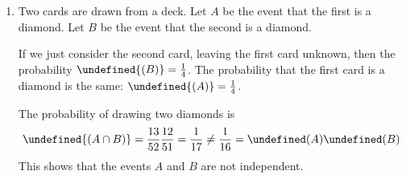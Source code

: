 \documentclass[letterpaper,11pt]{article}
\let\P\undefined
\DeclareMathOperator{\P}{\mathbb{P}}
\newcommand{\intersn}{\cap}
\begin{document}
\begin{enumerate}
\begin{proof}
            \begin{equation*}
                \P(\text{Red}) = \prod_{i=0}^9 \frac{26 - i}{52 - i}
                = \frac{4}{21}
            \end{equation*}

            By symmetry, we have the same probability for drawing ten black
            cards. Finally, we compute the probability of drawing cards of
            different colors.

            \begin{equation*}
                \P{(\text{Red or Black})} = 1 - \frac{8}{21} = \frac{13}{21}
            \end{equation*}
        \end{proof}

    \item
        Two cards are drawn from a deck. Let $A$ be the event that the first is
        a diamond. Let $B$ be the event that the second is a diamond.

        If we just consider the second card, leaving the first card unknown,
        then the probability $\P{(B)} = \frac{1}{4}$. The probability that the
        first card is a diamond is the same: $\P{(A)} = \frac{1}{4}$.

        The probability of drawing two diamonds is
        \begin{equation*}
            \P{(A \intersn B)} = \frac{13}{52} \frac{12}{51} = \frac{1}{17}
            \neq
            \frac{1}{16} = \P(A) \P(B)
        \end{equation*}
        This shows that the events $A$ and $B$ are not independent.
\end{enumerate}
\end{document}
